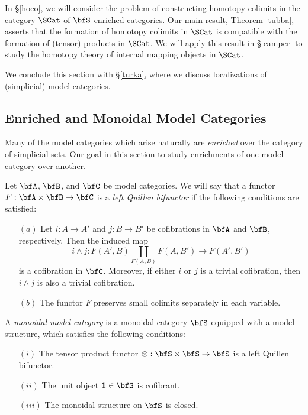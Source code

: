 In \S \ref{hoco}, we will consider the problem of constructing homotopy colimits in
the category $\SCat$ of $\bfS$-enriched categories. Our main result, Theorem \ref{tubba}, asserts
that the formation of homotopy colimits in $\SCat$ is compatible with the formation of
(tensor) products in $\SCat$. We will apply this result in \S \ref{camper} to study the homotopy
theory of internal mapping objects in $\SCat$. 

We conclude this section with \S \ref{turka}, where we discuss localizations of (simplicial) model categories.


\subsection{Enriched and Monoidal Model Categories}\label{maymy}

Many of the model categories which arise naturally are {\em enriched} over the category
of simplicial sets. Our goal in this section to study enrichments of one model category over another.

\begin{definition}\label{biquill}
Let $\bfA$, $\bfB$, and $\bfC$ be model categories. We will say that a functor
$F: \bfA \times \bfB \rightarrow \bfC$ is a {\em left Quillen bifunctor} if the following conditions
are satisfied:
\begin{itemize}
\item[$(a)$] Let $i: A \rightarrow A'$ and $j: B \rightarrow B'$ be cofibrations in $\bfA$ and
$\bfB$, respectively. Then the induced map
$$i \wedge j: F(A',B) \coprod_{F(A,B)} F(A,B') \rightarrow F(A',B')$$
is a cofibration in $\bfC$. Moreover, if either $i$ or $j$ is a trivial cofibration, then
$i \wedge j$ is also a trivial cofibration.
\item[$(b)$] The functor $F$ preserves small colimits separately in each variable.
\end{itemize}
\end{definition}

\begin{definition}
A {\it monoidal model category} is a monoidal category $\bfS$ equipped with a model structure, which satisfies the following conditions:
\begin{itemize}
\item[$(i)$] The tensor product functor $\otimes: \bfS \times \bfS \rightarrow \bfS$ is a left
Quillen bifunctor.
\item[$(ii)$] The unit object ${\bf 1} \in \bfS$ is cofibrant.
\item[$(iii)$] The monoidal structure on $\bfS$ is closed.
\end{itemize}
\end{definition}

